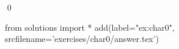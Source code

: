 
\begin{ex} 
  \label{ex:char0}
  
  \qed
\end{ex} 
\begin{python0}
from solutions import *
add(label="ex:char0",
    srcfilename='exercises/char0/answer.tex') 
\end{python0}
